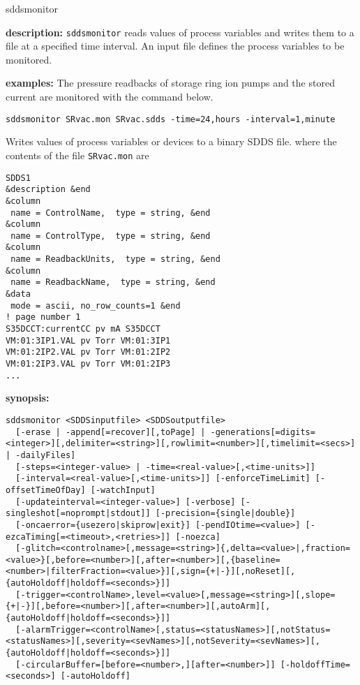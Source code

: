 \begin{sddsprog}{sddsmonitor}
\item \textbf{description:}
\verb+sddsmonitor+ reads values of process variables and writes them to a file at a specified time interval.
An input file defines the process variables to be monitored.
\item \textbf{examples:}
%
The pressure readbacks of storage ring ion pumps and the stored current are monitored
with the command below.
\begin{verbatim}
sddsmonitor SRvac.mon SRvac.sdds -time=24,hours -interval=1,minute
\end{verbatim}
Writes values of process variables or devices to a binary SDDS file.
where the contents of the file \verb+SRvac.mon+ are
\begin{verbatim}
SDDS1
&description &end
&column
 name = ControlName,  type = string, &end
&column
 name = ControlType,  type = string, &end
&column
 name = ReadbackUnits,  type = string, &end
&column
 name = ReadbackName,  type = string, &end
&data
 mode = ascii, no_row_counts=1 &end
! page number 1
S35DCCT:currentCC pv mA S35DCCT
VM:01:3IP1.VAL pv Torr VM:01:3IP1
VM:01:2IP2.VAL pv Torr VM:01:2IP2
VM:01:2IP3.VAL pv Torr VM:01:2IP3
...
\end{verbatim}
\item \textbf{synopsis:}
\begin{verbatim}
sddsmonitor <SDDSinputfile> <SDDSoutputfile>
  [-erase | -append[=recover][,toPage] | -generations[=digits=<integer>][,delimiter=<string>][,rowlimit=<number>][,timelimit=<secs>] | -dailyFiles]
  [-steps=<integer-value> | -time=<real-value>[,<time-units>]]
  [-interval=<real-value>[,<time-units>]] [-enforceTimeLimit] [-offsetTimeOfDay] [-watchInput]
  [-updateinterval=<integer-value>] [-verbose] [-singleshot[=noprompt|stdout]] [-precision={single|double}]
  [-oncaerror={usezero|skiprow|exit}] [-pendIOtime=<value>] [-ezcaTiming[=<timeout>,<retries>]] [-noezca]
  [-glitch=<controlname>[,message=<string>]{,delta=<value>|,fraction=<value>}[,before=<number>][,after=<number>][,{baseline=<number>|filterFraction=<value>}][,sign={+|-}][,noReset][,{autoHoldoff|holdoff=<seconds>}]]
  [-trigger=<controlName>,level=<value>[,message=<string>][,slope={+|-}][,before=<number>][,after=<number>][,autoArm][,{autoHoldoff|holdoff=<seconds>}]]
  [-alarmTrigger=<controlName>[,status=<statusNames>][,notStatus=<statusNames>][,severity=<sevNames>][,notSeverity=<sevNames>][,{autoHoldoff|holdoff=<seconds>}]]
  [-circularBuffer=[before=<number>,][after=<number>]] [-holdoffTime=<seconds>] [-autoHoldoff]

\end{verbatim}
\end{sddsprog}
